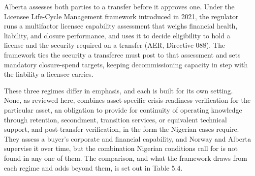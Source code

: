 Alberta assesses both parties to a transfer before it approves one.
Under the Licensee Life-Cycle Management framework introduced in 2021,
the regulator runs a multifactor licensee capability assessment that
weighs financial health, liability, and closure performance, and uses it
to decide eligibility to hold a license and the security required on a
transfer (AER, Directive 088). The framework ties the security a
transferee must post to that assessment and sets mandatory closure-spend
targets, keeping decommissioning capacity in step with the liability a
licensee carries.

These three regimes differ in emphasis, and each is built for its own
setting. None, as reviewed here, combines asset-specific
crisis-readiness verification for the particular asset, an obligation to
provide for continuity of operating knowledge through retention,
secondment, transition services, or equivalent technical support, and
post-transfer verification, in the form the Nigerian cases require. They
assess a buyer's corporate and financial capability, and Norway and
Alberta supervise it over time, but the combination Nigerian conditions
call for is not found in any one of them. The comparison, and what the
framework draws from each regime and adds beyond them, is set out in
Table 5.4.

